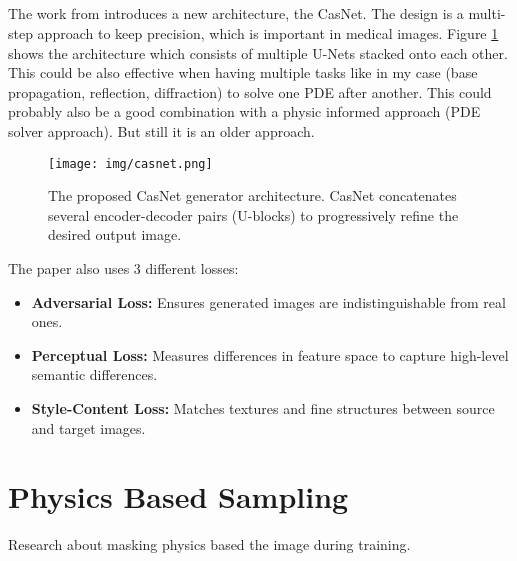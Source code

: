 		\subsection{}
			The work from \citeauthor{armanious_medgan_2020} introduces a new architecture, the CasNet. The design is a multi-step approach to keep precision, which is important in medical images. Figure \ref{fig:casnet} shows the architecture which consists of multiple U-Nets stacked onto each other.\\
			This could be also effective when having multiple tasks like in my case (base propagation, reflection, diffraction) to solve one PDE after another. This could probably also be a good combination with a physic informed approach (PDE solver approach). But still it is an older approach.
			\begin{figure}[H]
				\centering
				\texttt{[image: img/casnet.png]}
				\caption[CasNet]{The proposed CasNet generator architecture. CasNet concatenates several encoder-decoder pairs (U-blocks) to progressively refine the desired output image.}
				\label{fig:casnet}
			\end{figure}
			\FloatBarrier
			The paper also uses 3 different losses:
			\begin{itemize}
				\item \textbf{Adversarial Loss:} Ensures generated images are indistinguishable from real ones.
				\item \textbf{Perceptual Loss:} Measures differences in feature space to capture high-level semantic differences.
				\item \textbf{Style-Content Loss:} Matches textures and fine structures between source and target images.
			\end{itemize}
			
			
			
	
	\newpage
	\section{Physics Based Sampling}
	\label{sec:lit-physics-based-sampling}
		Research about masking physics based the image during training.
		
